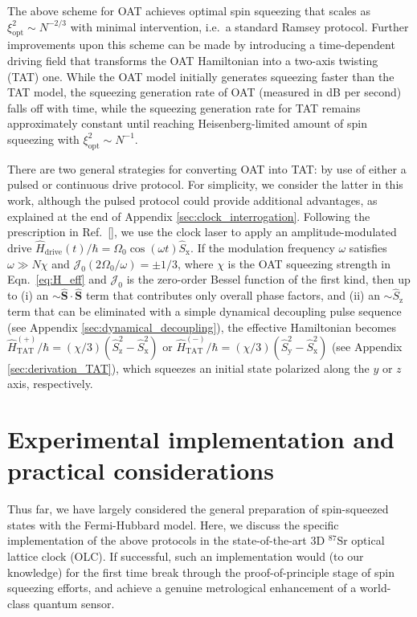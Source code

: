 \documentclass[aps,prx,superscriptaddress,notitlepage,twocolumn,longbibliography]{revtex4-2}
\renewcommand{\t}{\text} %
\newcommand{\p}[1]{\left(#1\right)} %
\renewcommand{\c}{\cdot} %
\renewcommand{\v}{\bm} %
\newcommand{\J}{\mathcal{J}}
\newcommand{\z}{\text{z}}
\newcommand{\x}{\text{x}}
\newcommand{\y}{\text{y}}
\begin{document}
The above scheme for OAT achieves optimal spin squeezing that scales as $\xi^2_{\t{opt}}\sim N^{-2/3}$ with minimal intervention, i.e.~a standard Ramsey protocol.
Further improvements upon this scheme can be made by introducing a time-dependent driving field that transforms the OAT Hamiltonian into a two-axis twisting (TAT) one.
While the OAT model initially generates squeezing faster than the TAT model, the squeezing generation rate of OAT (measured in dB per second) falls off with time, while the squeezing generation rate for TAT remains approximately constant until reaching Heisenberg-limited amount of spin squeezing with $\xi^2_{\t{opt}}\sim N^{-1}$\cite{kitagawa1993squeezed, supplementary_material}.

There are two general strategies for converting OAT into TAT: by use of either a pulsed\cite{liu2011spin} or continuous\cite{huang2015twoaxis} drive protocol.
For simplicity, we consider the latter in this  work, although the pulsed protocol could provide additional advantages, as explained at the end of Appendix \ref{sec:clock_interrogation}.
Following the prescription in Ref.~[], we use the clock laser to apply an amplitude-modulated drive $\hat H_{\t{drive}}(t)/\hbar=\Omega_0\cos(\omega t)\hat{S}_\x$.
If the modulation frequency $\omega$ satisfies $\omega\gg N\chi$ and $\J_0\p{2\Omega_0/\omega}=\pm1/3$, where $\chi$ is the OAT squeezing strength in Eqn.~\eqref{eq:H_eff} and $\J_0$ is the zero-order Bessel function of the first kind, then up to (i) an $\sim\hat{\v S}\c\hat{\v S}$ term that contributes only overall phase factors, and (ii) an $\sim\hat S_\z$ term that can be eliminated with a simple dynamical decoupling pulse sequence (see Appendix \ref{sec:dynamical_decoupling}), the effective Hamiltonian becomes $\hat H_{\t{TAT}}^{(+)}/\hbar = (\chi/3)(\hat S_\z^2-\hat S_\x^2)$ or $\hat H_{\t{TAT}}^{(-)}/\hbar = (\chi/3)(\hat S_\y^2-\hat S_\x^2)$ (see Appendix \ref{sec:derivation_TAT}), which squeezes an initial state polarized along the $y$ or $z$ axis, respectively.

\section{Experimental implementation and practical considerations}

Thus far, we have largely considered the general preparation of spin-squeezed states with the Fermi-Hubbard model.
Here, we discuss the specific implementation of the above protocols in the state-of-the-art 3D $^{87}$Sr optical lattice clock (OLC).
If successful, such an implementation would (to our knowledge) for the first time break through the proof-of-principle stage of spin squeezing efforts, and achieve a genuine metrological enhancement of a world-class quantum sensor.
\end{document}
